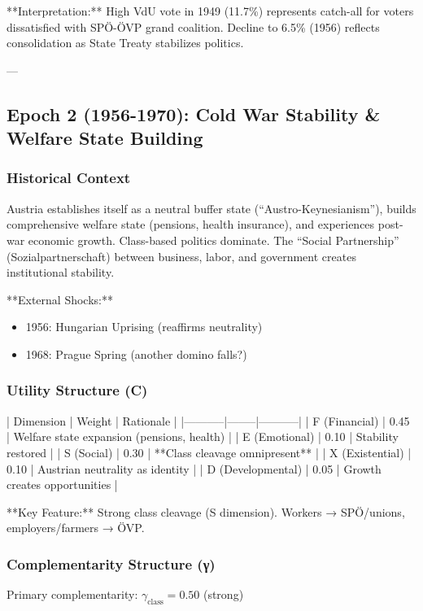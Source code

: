 **Interpretation:** High VdU vote in 1949 (11.7\%) represents catch-all for voters dissatisfied with SPÖ-ÖVP grand coalition. Decline to 6.5\% (1956) reflects consolidation as State Treaty stabilizes politics.

---

\subsection{Epoch 2 (1956-1970): Cold War Stability \& Welfare State Building}

\subsubsection{Historical Context}

Austria establishes itself as a neutral buffer state (``Austro-Keynesianism''), builds comprehensive welfare state (pensions, health insurance), and experiences post-war economic growth. Class-based politics dominate. The ``Social Partnership'' (Sozialpartnerschaft) between business, labor, and government creates institutional stability.

**External Shocks:**
\begin{itemize}
\item 1956: Hungarian Uprising (reaffirms neutrality)
\item 1968: Prague Spring (another domino falls?)
\end{itemize}

\subsubsection{Utility Structure (C)}

| Dimension | Weight | Rationale |
|-----------|--------|-----------|
| F (Financial) | 0.45 | Welfare state expansion (pensions, health) |
| E (Emotional) | 0.10 | Stability restored |
| S (Social) | 0.30 | **Class cleavage omnipresent** |
| X (Existential) | 0.10 | Austrian neutrality as identity |
| D (Developmental) | 0.05 | Growth creates opportunities |

**Key Feature:** Strong class cleavage (S dimension). Workers → SPÖ/unions, employers/farmers → ÖVP.

\subsubsection{Complementarity Structure (γ)}

Primary complementarity: $\gamma_{\text{class}} = 0.50$ (strong)

